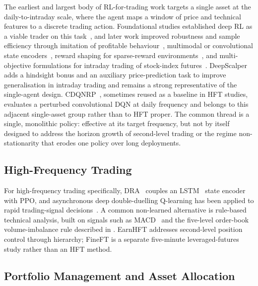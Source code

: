 The earliest and largest body of RL-for-trading work targets a single asset at the daily-to-intraday scale, where the agent maps a window of price and technical features to a discrete trading action. Foundational studies established deep RL as a viable trader on this task~\cite{zhang2019deep,theate2021application,li2019deep}, and later work improved robustness and sample efficiency through imitation of profitable behaviour~\cite{liu2020adaptive,ding2018investor}, multimodal or convolutional state encoders~\cite{shin2019deep}, reward shaping for sparse-reward environments~\cite{takara4411793deep}, and multi-objective formulations for intraday trading of stock-index futures~\cite{si2017multi}. DeepScalper~\cite{sun2022deepscalper} adds a hindsight bonus and an auxiliary price-prediction task to improve generalisation in intraday trading and remains a strong representative of the single-agent design. CDQNRP~\cite{zhu2022quantitative}, sometimes reused as a baseline in HFT studies, evaluates a perturbed convolutional DQN at daily frequency and belongs to this adjacent single-asset group rather than to HFT proper. The common thread is a single, monolithic policy: effective at its target frequency, but not by itself designed to address the horizon growth of second-level trading or the regime non-stationarity that erodes one policy over long deployments.

\subsection{High-Frequency Trading}
\label{sec:bg_hft}

For high-frequency trading specifically, DRA~\cite{briola2021deep} couples an LSTM~\cite{hochreiter1997long} state encoder with PPO, and asynchronous deep double-duelling Q-learning has been applied to rapid trading-signal decisions~\cite{nagy2023asynchronous}. A common non-learned alternative is rule-based technical analysis, built on signals such as MACD~\cite{appel2005technical} and the five-level order-book volume-imbalance rule described in . EarnHFT addresses second-level position control through hierarchy; FineFT is a separate five-minute leveraged-futures study rather than an HFT method.

\subsection{Portfolio Management and Asset Allocation}
\label{sec:bg_portfolio}

